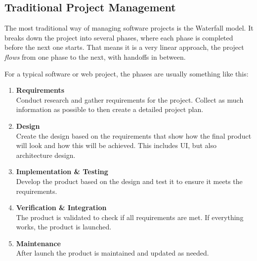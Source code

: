 \newpage
\subsection{Traditional Project Management}
The most traditional way of managing software projects is the Waterfall model. It breaks down the
project into several phases, where each phase is completed before the next one starts. That means
it is a very linear approach, the project \textit{flows} from one phase to the next, with handoffs in
between. 

For a typical software or web project, the phases are usually something like this: %
\begin{enumerate}
    \item \textbf{Requirements}\\
          Conduct research and gather requirements for the project. Collect as much information
          as possible to then create a detailed project plan.
    \item \textbf{Design}\\
          Create the design based on the requirements that show how the final product will look
          and how this will be achieved. This includes UI, but also architecture design.
    \item \textbf{Implementation \& Testing}\\
          Develop the product based on the design and test it to ensure it meets the
          requirements.
    \item \textbf{Verification \& Integration}\\
          The product is validated to check if all requirements are met. If everything works,
          the product is launched.
    \item \textbf{Maintenance}\\
          After launch the product is maintained and updated as needed.
\end{enumerate}

